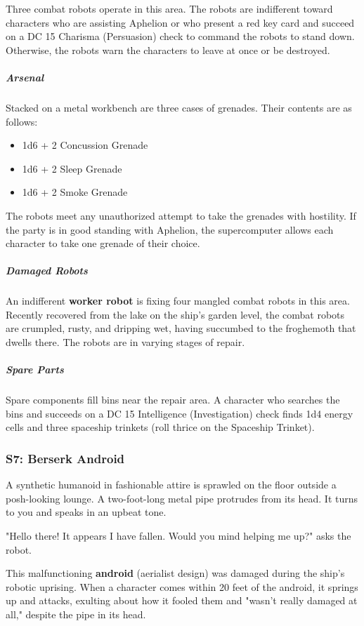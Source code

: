 \documentclass[10pt,a4paper,twoside,bg=print,twocolumn,openany,nodeprecatedcode]{dndbook}
\begin{document}
Three combat robots operate in this area. The robots are indifferent toward characters who are assisting Aphelion or who present a red key card and succeed on a DC 15 Charisma (Persuasion) check to command the robots to stand down. Otherwise, the robots warn the characters to leave at once or be destroyed.

\subparagraph{Arsenal}
Stacked on a metal workbench are three cases of grenades. Their contents are as follows:


\begin{itemize}
\item 1d6 + 2 Concussion Grenade
\item 1d6 + 2 Sleep Grenade
\item 1d6 + 2 Smoke Grenade
\end{itemize}

The robots meet any unauthorized attempt to take the grenades with hostility. If the party is in good standing with Aphelion, the supercomputer allows each character to take one grenade of their choice.

\subparagraph{Damaged Robots}
An indifferent \textbf{worker robot} is fixing four mangled combat robots in this area. Recently recovered from the lake on the ship's garden level, the combat robots are crumpled, rusty, and dripping wet, having succumbed to the froghemoth that dwells there. The robots are in varying stages of repair.

\subparagraph{Spare Parts}
Spare components fill bins near the repair area. A character who searches the bins and succeeds on a DC 15 Intelligence (Investigation) check finds 1d4 energy cells and three spaceship trinkets (roll thrice on the Spaceship Trinket).

\subsubsection{S7: Berserk Android}
\begin{DndReadAloud}{}
A synthetic humanoid in fashionable attire is sprawled on the floor outside a posh-looking lounge. A two-foot-long metal pipe protrudes from its head. It turns to you and speaks in an upbeat tone.

"Hello there! It appears I have fallen. Would you mind helping me up?" asks the robot.

\end{DndReadAloud}

This malfunctioning \textbf{android} (aerialist design) was damaged during the ship's robotic uprising. When a character comes within 20 feet of the android, it springs up and attacks, exulting about how it fooled them and "wasn't really damaged at all," despite the pipe in its head.
\end{document}
